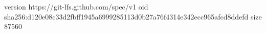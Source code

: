 version https://git-lfs.github.com/spec/v1
oid sha256:d120e08c33d2fbff1945a6999285113d0b27a76f4314e342ecc965afcd8ddefd
size 87560
